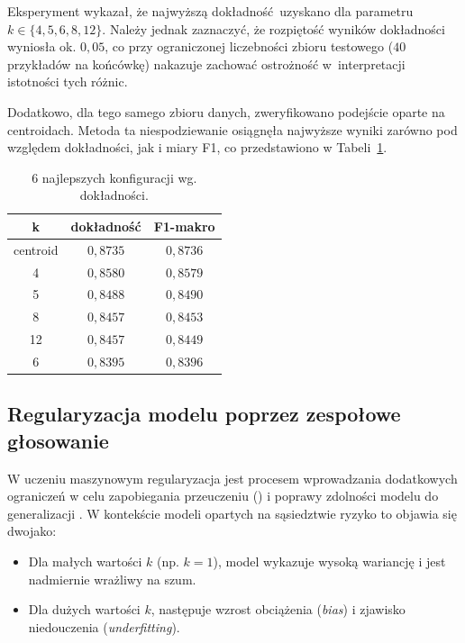 
Eksperyment wykazał, że najwyższą dokładność uzyskano dla parametru $k \in \{4, 5, 6, 8, 12\}$. Należy jednak zaznaczyć, że rozpiętość wyników dokładności wyniosła ok. $0{,}05$, co przy ograniczonej liczebności zbioru testowego ($40$ przykładów na końcówkę) nakazuje zachować ostrożność w~interpretacji istotności tych różnic. 

Dodatkowo, dla tego samego zbioru danych, zweryfikowano podejście oparte na centroidach. Metoda ta niespodziewanie osiągnęła najwyższe wyniki zarówno pod względem dokładności, jak i miary F1, co przedstawiono w Tabeli~\ref{tab:top_configurations}.

\begin{table}[H]
    \centering
    \caption{6 najlepszych konfiguracji wg. dokładności.}
    \label{tab:top_configurations}
    \begin{tabular}{|c|c|c|}
        \hline
        \textbf{k} & \textbf{dokładność} & \textbf{F1-makro} \\ 
        \hline
        centroid & $0{,}8735$ & $0{,}8736$ \\ 
        \hline
        4 & $0{,}8580$ & $0{,}8579$ \\ 
        \hline
        5 & $0{,}8488$ & $0{,}8490$ \\ 
        \hline
        8 & $0{,}8457$ & $0{,}8453$ \\ 
        \hline
        12 & $0{,}8457$ & $0{,}8449$ \\ 
        \hline
        6 & $0{,}8395$ & $0{,}8396$ \\ 
        \hline
    \end{tabular}
\end{table}


\subsection{Regularyzacja modelu poprzez zespołowe głosowanie}

W uczeniu maszynowym regularyzacja jest procesem wprowadzania dodatkowych ograniczeń w celu zapobiegania przeuczeniu () i poprawy zdolności modelu do generalizacji \cite{goodfellow2016}. W kontekście modeli opartych na sąsiedztwie ryzyko to objawia się dwojako:

\begin{itemize}
    \item Dla małych wartości $k$ (np. $k=1$), model wykazuje wysoką wariancję i jest nadmiernie wrażliwy na szum.
    \item Dla dużych wartości $k$, następuje wzrost obciążenia (\textit{bias}) i zjawisko niedouczenia (\textit{underfitting}).
\end{itemize}


